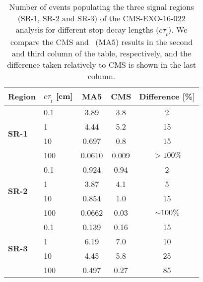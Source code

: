 \begin{table}
\begin{center}
  \begin{tabular}{l || l | c  c | c }
  \label{tab:cms_exo}
    Region & $c\tau_{\tilde t}$ [cm] & MA5 & CMS& Difference [\%] \\ \hline\hline
    \multirow{4}{*}{\bf SR-1}& 0.1 & 3.89   & 3.8  & 2\\
                             & 1   & 4.44   & 5.2  & 15\\
                             & 10  & 0.697  & 0.8  & 15\\
                             & 100 & 0.0610 & 0.009& $> 100\%$\\ \hline
    \multirow{4}{*}{\bf SR-2}& 0.1 & 0.924  & 0.94 & 2\\
                             & 1   & 3.87   & 4.1  & 5\\
                             & 10  & 0.854  & 1.0  & 15\\
                             & 100 & 0.0662 & 0.03 & $\sim 100\%$\\ \hline
    \multirow{4}{*}{\bf SR-3}& 0.1 & 0.139  & 0.16 & 15\\
                             & 1   & 6.19   & 7.0  & 10\\
                             & 10  & 4.45   & 5.8  & 25\\
                             & 100 & 0.497  & 0.27 & 85\\
  \end{tabular}
  \caption{Number of events populating the three signal regions (SR-1, SR-2 and SR-3) of the
    CMS-EXO-16-022 analysis for different stop decay lengths ($c\tau_{\tilde t}$).
    We compare the CMS and \MA~(MA5) results in the second
    and third column of the table, respectively, and the difference taken relatively to CMS is
    shown in the last column.}
\end{center}
\end{table}
\renewcommand{\arraystretch}{1}


